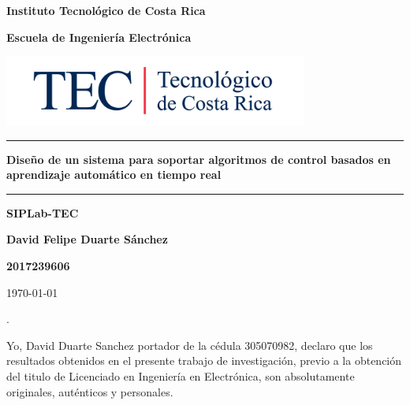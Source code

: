 \documentclass[12pt]{article}
\begin{document}
\begin{titlepage}

  \centering


  \vspace{10cm}

  \textbf{\LARGE Instituto Tecnológico de Costa Rica}

  \vspace{2cm}

  \textbf{\LARGE Escuela de Ingeniería Electrónica}

  \vspace{2cm}

  \includegraphics[width=10cm]{logotec/image.png}
  \vspace{2cm}

  \hrule

  \vspace{1cm}

  \textbf{\LARGE Diseño de un sistema para soportar algoritmos de control basados en aprendizaje automático en tiempo real}

  \vspace{1cm}

  \hrule

  \vspace{1cm}

  \textbf{\LARGE SIPLab-TEC}

  \vspace{1cm}

  \textbf{\LARGE David Felipe Duarte Sánchez}

  \vspace{1cm}

  \textbf{\LARGE 2017239606}

  \vspace{1cm}

  \today %

\end{titlepage}
.
\par
\vspace{16cm} %

Yo, David Duarte Sanchez portador de la cédula 305070982, declaro que los resultados obtenidos en el presente trabajo de investigación, previo a la obtención del titulo de Licenciado en Ingeniería en Electrónica, son absolutamente originales, auténticos y personales.
\end{document}

